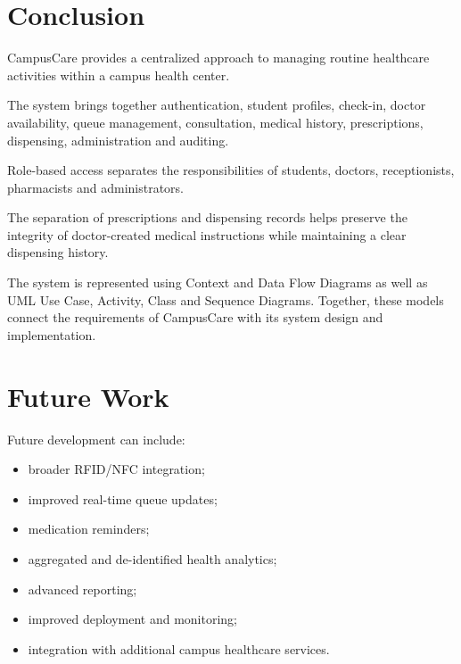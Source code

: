 \documentclass{tietreport}
\begin{document}
\section{Conclusion}

CampusCare provides a centralized approach to managing routine
healthcare activities within a campus health center.

The system brings together authentication, student profiles,
check-in, doctor availability, queue management, consultation,
medical history, prescriptions, dispensing, administration and
auditing.

Role-based access separates the responsibilities of students,
doctors, receptionists, pharmacists and administrators.

The separation of prescriptions and dispensing records helps
preserve the integrity of doctor-created medical instructions while
maintaining a clear dispensing history.

The system is represented using Context and Data Flow Diagrams as well
as UML Use Case, Activity, Class and Sequence Diagrams. Together,
these models connect the requirements of CampusCare with its system
design and implementation.

\section{Future Work}

Future development can include:

\begin{itemize}
    \item broader RFID/NFC integration;
    \item improved real-time queue updates;
    \item medication reminders;
    \item aggregated and de-identified health analytics;
    \item advanced reporting;
    \item improved deployment and monitoring;
    \item integration with additional campus healthcare services.
\end{itemize}



\nocite{*}

\printbibliography[
    heading=bibintoc,
    title={References}
]

\end{document}

